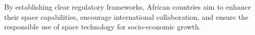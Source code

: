 \documentclass[final,5p,times, twocolumn, sort&compress, sc]{elsarticle}
\begin{document}
	
 	By establishing clear regulatory frameworks, African countries aim to enhance their space capabilities, encourage international collaboration, and ensure the responsible use of space technology for socio-economic growth.
\end{document}
